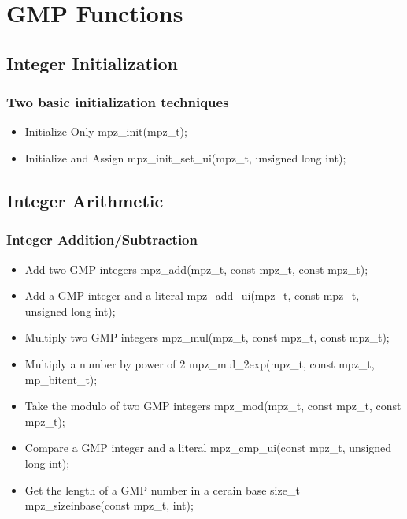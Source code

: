 \section{GMP Functions}


\subsection{Integer Initialization}

\begin{frame}
\frametitle{Two basic initialization techniques}
  \begin{itemize}
    \item Initialize Only\break
    mpz\_init(mpz\_t);
    \item Initialize and Assign\break
    mpz\_init\_set\_ui(mpz\_t, unsigned long int);
  \end{itemize}
\end{frame}


\subsection{Integer Arithmetic}

\begin{frame}
\frametitle{Integer Addition/Subtraction}
  \begin{itemize}
    \item Add two GMP integers\break
    mpz\_add(mpz\_t, const mpz\_t, const mpz\_t);
    \item Add a GMP integer and a literal\break
    mpz\_add\_ui(mpz\_t, const mpz\_t, unsigned long int);
    \item Multiply two GMP integers
    mpz\_mul(mpz\_t, const mpz\_t, const mpz\_t);
    \item Multiply a number by power of 2\break
    mpz\_mul\_2exp(mpz\_t, const mpz\_t, mp\_bitcnt\_t);
    \item Take the modulo of two GMP integers\break
    mpz\_mod(mpz\_t, const mpz\_t, const mpz\_t);
    \item Compare a GMP integer and a literal\break
    mpz\_cmp\_ui(const mpz\_t, unsigned long int);
    \item Get the length of a GMP number in a cerain base\break
    size\_t mpz\_sizeinbase(const mpz\_t, int);
  \end{itemize}
\end{frame}

